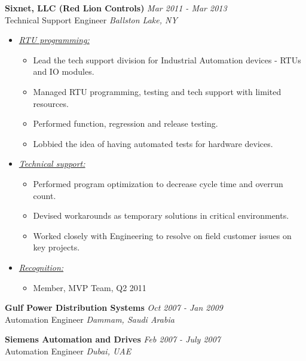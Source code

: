 \documentclass{article}
\begin{document}
    {\bf Sixnet, LLC (Red Lion Controls)} \hfill {\em Mar 2011 - Mar 2013} \\
    Technical Support Engineer \hfill {\em Ballston Lake, NY} \\
    \begin{itemize}
    \item \underline{\it RTU programming:}
          \begin{itemize}
          \item Lead the tech support division for Industrial Automation
                devices - RTUs and IO modules.
          \item Managed RTU programming, testing and tech support with limited
                resources.
          \item Performed function, regression and release testing.
          \item Lobbied the idea of having automated tests for hardware devices.
          \end{itemize}
    \item \underline{\it Technical support:}
          \begin{itemize}
          \item Performed program optimization to decrease cycle time and
                overrun count.
          \item Devised workarounds as temporary solutions in critical
                environments.
          \item Worked closely with Engineering to resolve on field customer
                issues on key projects.
          \end{itemize}
    \item \underline{\it Recognition:}
          \begin{itemize}
          \item Member, MVP Team, Q2 2011
          \end{itemize}
    \end{itemize}
    \smallskip

    {\bf Gulf Power Distribution Systems} \hfill {\em Oct 2007 - Jan 2009} \\
    Automation Engineer \hfill {\em Dammam, Saudi Arabia} \\
    \smallskip

    {\bf Siemens Automation and Drives} \hfill {\em Feb 2007 - July 2007} \\
    Automation Engineer \hfill {\em Dubai, UAE} \\
    \smallskip
\end{document}
